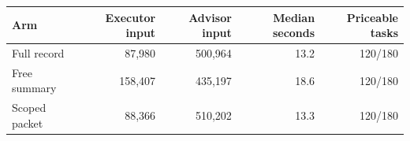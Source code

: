 \begin{tabular}{lrrrr}
\toprule
Arm & Executor input & Advisor input & Median seconds & Priceable tasks \\
\midrule
Full record & 87,980 & 500,964 & 13.2 & 120/180 \\
Free summary & 158,407 & 435,197 & 18.6 & 120/180 \\
Scoped packet & 88,366 & 510,202 & 13.3 & 120/180 \\
\bottomrule
\end{tabular}
